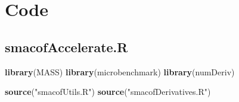 \documentclass[
  12pt,
]{article}
\newenvironment{Shaded}{\begin{snugshade}}{\end{snugshade}}
\newcommand{\FunctionTok}[1]{\textcolor[rgb]{0.13,0.29,0.53}{\textbf{#1}}}
\newcommand{\NormalTok}[1]{#1}
\newcommand{\StringTok}[1]{\textcolor[rgb]{0.31,0.60,0.02}{#1}}
\begin{document}
\appendix


\section{Code}\label{code}

\subsection{smacofAccelerate.R}\label{smacofaccelerate.r}

\begin{Shaded}
\begin{Highlighting}[]
\FunctionTok{library}\NormalTok{(MASS)}
\FunctionTok{library}\NormalTok{(microbenchmark)}
\FunctionTok{library}\NormalTok{(numDeriv)}

\FunctionTok{source}\NormalTok{(}\StringTok{"smacofUtils.R"}\NormalTok{)}
\FunctionTok{source}\NormalTok{(}\StringTok{"smacofDerivatives.R"}\NormalTok{)}


\end{Highlighting}
\end{Shaded}
\end{document}
